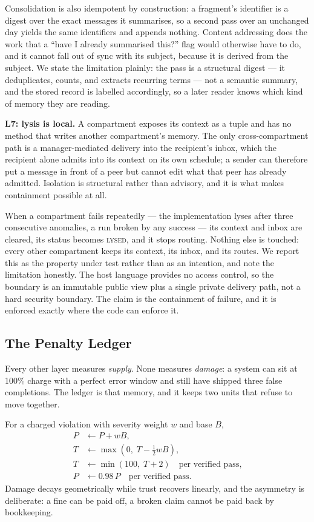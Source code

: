 \documentclass[conference]{IEEEtran}
\begin{document}
Consolidation is also idempotent by construction: a fragment's identifier is a
digest over the exact messages it summarises, so a second pass over an unchanged
day yields the same identifiers and appends nothing. Content addressing does the
work that a ``have I already summarised this?'' flag would otherwise have to do,
and it cannot fall out of sync with its subject, because it is derived from the
subject. We state the limitation plainly: the pass is a structural digest --- it
deduplicates, counts, and extracts recurring terms --- not a semantic summary, and
the stored record is labelled accordingly, so a later reader knows which kind of
memory they are reading.

\textbf{L7: lysis is local.}
A compartment exposes its context as a tuple and has no method that writes another
compartment's memory. The only cross-compartment path is a manager-mediated
delivery into the recipient's inbox, which the recipient alone admits into its
context on its own schedule; a sender can therefore put a message in front of a
peer but cannot edit what that peer has already admitted. Isolation is structural
rather than advisory, and it is what makes containment possible at all.

When a compartment fails repeatedly --- the implementation lyses after three
consecutive anomalies, a run broken by any success --- its context and inbox are
cleared, its status becomes \textsc{lysed}, and it stops routing. Nothing else is
touched: every other compartment keeps its context, its inbox, and its routes. We
report this as the property under test rather than as an intention, and note the
limitation honestly. The host language provides no access control, so the
boundary is an immutable public view plus a single private delivery path, not a
hard security boundary. The claim is the containment of failure, and it is
enforced exactly where the code can enforce it.

\subsection{The Penalty Ledger}
\label{sec:ledger}

Every other layer measures \emph{supply}. None measures \emph{damage}: a system
can sit at 100\% charge with a perfect error window and still have shipped three
false completions. The ledger is that memory, and it keeps two units that refuse
to move together.

For a charged violation with severity weight $w$ and base $B$,
\begin{align}
  P &\leftarrow P + wB, \label{eq:penalty}\\
  T &\leftarrow \max\!\left(0,\; T - \tfrac{1}{2}wB\right), \label{eq:trust}\\
  T &\leftarrow \min\!\left(100,\; T + 2\right) \quad\text{per verified pass,}
  \label{eq:recover}\\
  P &\leftarrow 0.98\,P \quad\text{per verified pass.} \label{eq:amortise}
\end{align}
Damage decays geometrically while trust recovers linearly, and the asymmetry is
deliberate: a fine can be paid off, a broken claim cannot be paid back by
bookkeeping.
\end{document}
